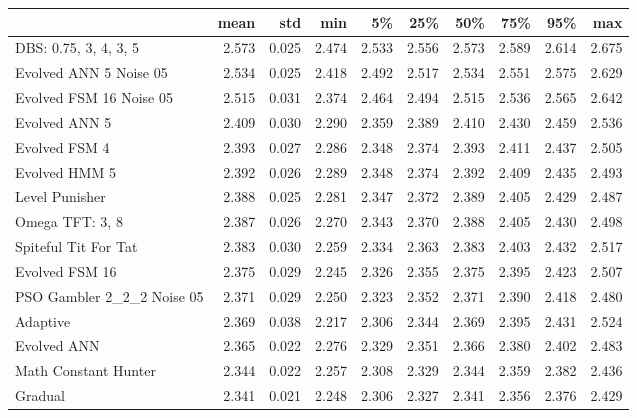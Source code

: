 \begin{tabular}{lrrrrrrrrr}
\toprule
{} &   mean &    std &    min &     5\% &    25\% &    50\% &    75\% &    95\% &    max \\
\midrule
DBS: 0.75, 3, 4, 3, 5      &  2.573 &  0.025 &  2.474 &  2.533 &  2.556 &  2.573 &  2.589 &  2.614 &  2.675 \\
Evolved ANN 5 Noise 05     &  2.534 &  0.025 &  2.418 &  2.492 &  2.517 &  2.534 &  2.551 &  2.575 &  2.629 \\
Evolved FSM 16 Noise 05    &  2.515 &  0.031 &  2.374 &  2.464 &  2.494 &  2.515 &  2.536 &  2.565 &  2.642 \\
Evolved ANN 5              &  2.409 &  0.030 &  2.290 &  2.359 &  2.389 &  2.410 &  2.430 &  2.459 &  2.536 \\
Evolved FSM 4              &  2.393 &  0.027 &  2.286 &  2.348 &  2.374 &  2.393 &  2.411 &  2.437 &  2.505 \\
Evolved HMM 5              &  2.392 &  0.026 &  2.289 &  2.348 &  2.374 &  2.392 &  2.409 &  2.435 &  2.493 \\
Level Punisher             &  2.388 &  0.025 &  2.281 &  2.347 &  2.372 &  2.389 &  2.405 &  2.429 &  2.487 \\
Omega TFT: 3, 8            &  2.387 &  0.026 &  2.270 &  2.343 &  2.370 &  2.388 &  2.405 &  2.430 &  2.498 \\
Spiteful Tit For Tat       &  2.383 &  0.030 &  2.259 &  2.334 &  2.363 &  2.383 &  2.403 &  2.432 &  2.517 \\
Evolved FSM 16             &  2.375 &  0.029 &  2.245 &  2.326 &  2.355 &  2.375 &  2.395 &  2.423 &  2.507 \\
PSO Gambler 2\_2\_2 Noise 05 &  2.371 &  0.029 &  2.250 &  2.323 &  2.352 &  2.371 &  2.390 &  2.418 &  2.480 \\
Adaptive                   &  2.369 &  0.038 &  2.217 &  2.306 &  2.344 &  2.369 &  2.395 &  2.431 &  2.524 \\
Evolved ANN                &  2.365 &  0.022 &  2.276 &  2.329 &  2.351 &  2.366 &  2.380 &  2.402 &  2.483 \\
Math Constant Hunter       &  2.344 &  0.022 &  2.257 &  2.308 &  2.329 &  2.344 &  2.359 &  2.382 &  2.436 \\
Gradual                    &  2.341 &  0.021 &  2.248 &  2.306 &  2.327 &  2.341 &  2.356 &  2.376 &  2.429 \\
\bottomrule
\end{tabular}
